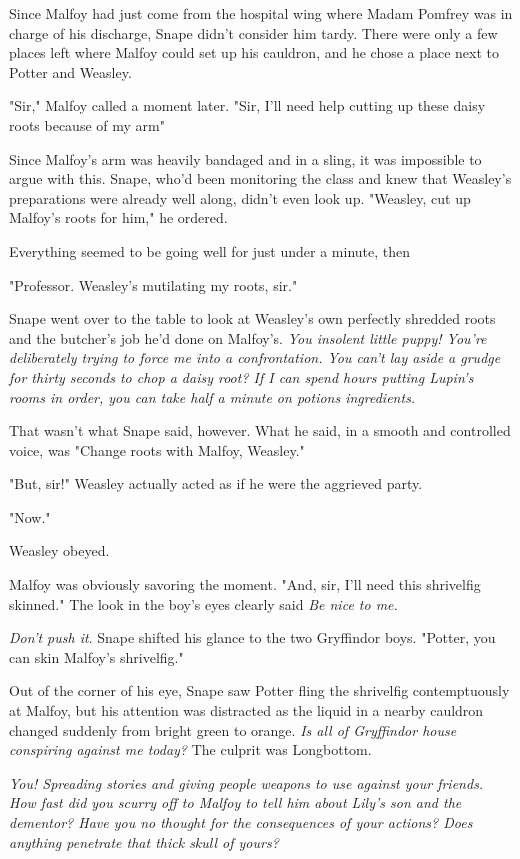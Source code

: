 Since Malfoy had just come from the hospital wing where Madam Pomfrey was in charge of his discharge, Snape didn't consider him tardy. There were only a few places left where Malfoy could set up his cauldron, and he chose a place next to Potter and Weasley.

"Sir," Malfoy called a moment later. "Sir, I'll need help cutting up these daisy roots because of my arm{\el}"

Since Malfoy's arm was heavily bandaged and in a sling, it was impossible to argue with this. Snape, who'd been monitoring the class and knew that Weasley's preparations were already well along, didn't even look up. "Weasley, cut up Malfoy's roots for him," he ordered.

Everything seemed to be going well for just under a minute, then{\el}

"Professor. Weasley's mutilating my roots, sir."

Snape went over to the table to look at Weasley's own perfectly shredded roots and the butcher's job he'd done on Malfoy's. \emph{You insolent little puppy! You're deliberately trying to force me into a confrontation. You can't lay aside a grudge for thirty seconds to chop a daisy root? If I can spend hours putting Lupin's rooms in order, you can take half a minute on potions ingredients.}

That wasn't what Snape said, however. What he said, in a smooth and controlled voice, was "Change roots with Malfoy, Weasley."

"But, sir!" Weasley actually acted as if he were the aggrieved party.

"Now."

Weasley obeyed.

Malfoy was obviously savoring the moment. "And, sir, I'll need this shrivelfig skinned." The look in the boy's eyes clearly said \emph{Be nice to me.}

\emph{Don't push it}. Snape shifted his glance to the two Gryffindor boys. "Potter, you can skin Malfoy's shrivelfig."

Out of the corner of his eye, Snape saw Potter fling the shrivelfig contemptuously at Malfoy, but his attention was distracted as the liquid in a nearby cauldron changed suddenly from bright green to orange. \emph{Is all of Gryffindor house conspiring against me today?} The culprit was Longbottom.

\emph{You! Spreading stories and giving people weapons to use against your friends. How fast did you scurry off to Malfoy to tell him about Lily's son and the dementor? Have you no thought for the consequences of your actions? Does anything penetrate that thick skull of yours?}

